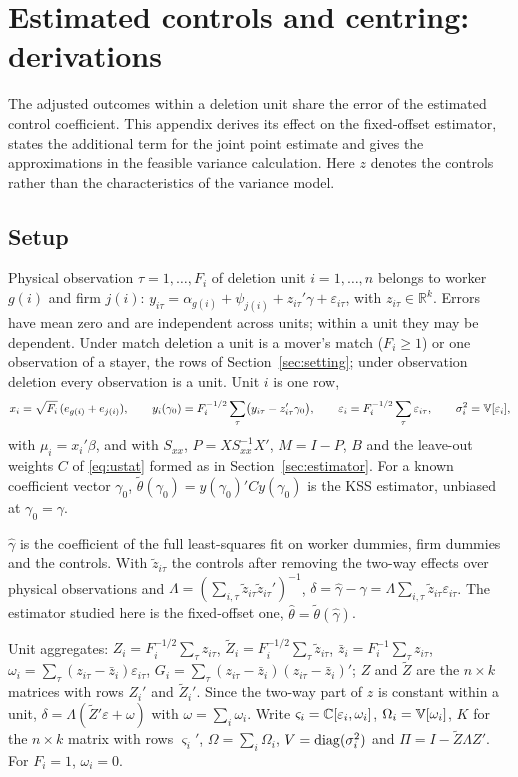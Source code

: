 \section{Estimated controls and centring: derivations}\label{app:controls}
The adjusted outcomes within a deletion unit share the error of the estimated control coefficient.
This appendix derives its effect on the fixed-offset estimator, states the additional term for the joint
point estimate and gives the approximations in the feasible variance calculation.
Here $z$ denotes the controls rather than the characteristics of the variance model.
\subsection{Setup}\label{ctl:setup}

Physical observation $\tau=1,\dots,F_i$ of deletion unit $i=1,\dots,n$ belongs to worker $g(i)$ and firm $j(i)$:
$y_{i\tau}=\alpha_{g(i)}+\psi_{j(i)}+z_{i\tau}'\gamma+\varepsilon_{i\tau}$, with $z_{i\tau}\in\mathbb{R}^k$. Errors have
mean zero and are independent across units; within a unit they may be dependent. Under match deletion a unit is a
mover's match ($F_i\ge1$) or one observation of a stayer, the rows of Section~\ref{sec:setting}; under observation
deletion every observation is a unit. Unit $i$ is one row,
\[
 x_i=\sqrt{F_i}\,(e_{g(i)}+e_{j(i)}),\qquad y_i(\gamma_0)=F_i^{-1/2}\sum_\tau\bigl(y_{i\tau}-z_{i\tau}'\gamma_0\bigr),\qquad
 \varepsilon_i=F_i^{-1/2}\sum_\tau\varepsilon_{i\tau},\qquad \sigma_i^2=\mathbb{V}[\varepsilon_i],
\]
with $\mu_i=x_i'\beta$, and with $S_{xx}$, $P=XS_{xx}^{-1}X'$, $M=I-P$, $B$ and the leave-out weights $C$ of
\eqref{eq:ustat} formed as in Section~\ref{sec:estimator}. For a known coefficient vector $\gamma_0$,
$\tilde\theta(\gamma_0)=y(\gamma_0)'Cy(\gamma_0)$ is the KSS estimator, unbiased at $\gamma_0=\gamma$.

$\hat\gamma$ is the coefficient of the full least-squares fit on worker dummies, firm dummies and the controls.
With $\tilde z_{i\tau}$ the controls after removing the two-way effects over physical observations and
$\Lambda=(\sum_{i,\tau}\tilde z_{i\tau}\tilde z_{i\tau}')^{-1}$, $\delta=\hat\gamma-\gamma=\Lambda\sum_{i,\tau}\tilde
z_{i\tau}\varepsilon_{i\tau}$. The estimator studied here is the fixed-offset one,
$\hat\theta=\tilde\theta(\hat\gamma)$.

Unit aggregates: $Z_i=F_i^{-1/2}\sum_\tau z_{i\tau}$, $\tilde Z_i=F_i^{-1/2}\sum_\tau\tilde z_{i\tau}$,
$\bar z_i=F_i^{-1}\sum_\tau z_{i\tau}$, $\omega_i=\sum_\tau(z_{i\tau}-\bar z_i)\varepsilon_{i\tau}$,
$G_i=\sum_\tau(z_{i\tau}-\bar z_i)(z_{i\tau}-\bar z_i)'$; $Z$ and $\tilde Z$ are the $n\times k$ matrices with rows
$Z_i'$ and $\tilde Z_i'$. Since the two-way part of $z$ is constant within a unit,
$\delta=\Lambda(\tilde Z'\varepsilon+\omega)$ with $\omega=\sum_i\omega_i$. Write $\varsigma_i=\mathbb{C}[\varepsilon_i,\omega_i]$,
$\Omega_i=\mathbb{V}[\omega_i]$, $K$ for the $n\times k$ matrix with rows $\varsigma_i'$, $\Omega=\sum_i\Omega_i$,
$V=\operatorname{diag}(\sigma_i^2)$ and $\Pi=I-\tilde Z\Lambda Z'$. For $F_i=1$, $\omega_i=0$.


